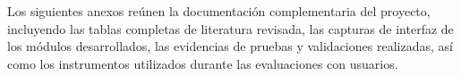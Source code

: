 Los siguientes anexos reúnen la documentación complementaria del proyecto, incluyendo las tablas completas de literatura revisada, las capturas de interfaz de los módulos desarrollados, las evidencias de pruebas y validaciones realizadas, así como los instrumentos utilizados durante las evaluaciones con usuarios.


